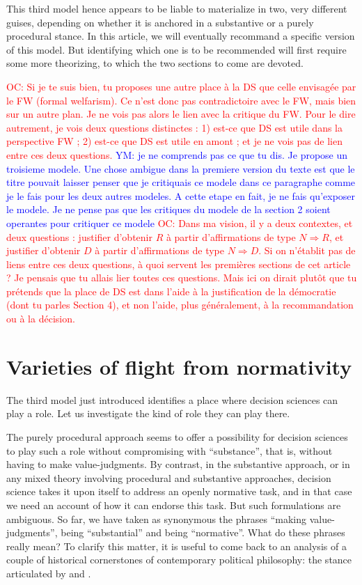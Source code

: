 \documentclass[preprint, french, english, 11pt]{elsarticle}%
\newcommand{\commentYM}[1]{\textcolor{blue}{YM: #1}}
\newcommand{\commentOC}[1]{\textcolor{red}{OC: #1}}
\begin{document}
This third model hence appears to be liable to materialize in two, very different guises, depending on whether it is anchored in a substantive or a purely procedural stance. In this article, we will eventually recommand a specific version of this model. But identifying which one is to be recommended will first require some more theorizing, to which the two sections to come are devoted. 

\commentOC{Si je te suis bien, tu proposes une
autre place à la DS que celle envisagée par le FW (formal
welfarism). Ce n’est donc pas contradictoire avec le FW, mais
bien sur un autre plan. Je ne vois pas alors le lien avec la
critique du FW.
Pour le dire autrement, je vois deux questions distinctes : 1)
est-ce que DS est utile dans la perspective FW ; 2) est-ce que
DS est utile en amont ; et je ne vois pas de lien entre ces
deux questions.}
\commentYM{je ne comprends pas ce que tu dis. Je propose un troisieme modele. Une chose ambigue dans la premiere version du texte est que le titre pouvait laisser penser que je critiquais ce modele dans ce paragraphe comme je le fais pour les deux autres modeles. A cette etape en fait, je ne fais qu'exposer le modele. Je ne pense pas que les critiques du modele de la section 2 soient operantes pour critiquer ce modele}
\commentOC{Dans ma vision, il y a deux contextes, et deux questions : justifier d’obtenir $R$ à partir d’affirmations de type $N ⇒ R$, et justifier d’obtenir $D$ à partir d’affirmations de type $N ⇒ D$. Si on n’établit pas de liens entre ces deux questions, à quoi servent les premières sections de cet article ? Je pensais que tu allais lier toutes ces questions. Mais ici on dirait plutôt que tu prétends que la place de DS est dans l’aide à la justification de la démocratie (dont tu parles Section 4), et non l’aide, plus généralement, à la recommandation ou à la décision.}

\section{Varieties of flight from normativity}
\noindent The third model just introduced identifies a place where decision sciences can play a role. Let us investigate the kind of role they can play there.

The purely procedural approach seems to offer a possibility for decision sciences to play such a role without compromising with ``substance'', that is, without having to make value-judgments. By contrast, in the substantive approach, or in any mixed theory involving procedural and substantive approaches, decision science takes it upon itself to address an openly normative task, and in that case we need an account of how it can endorse this task.
But such formulations are ambiguous. So far, we have taken as synonymous the phrases ``making value-judgments'', being ``substantial'' and being ``normative''. What do these phrases really mean? To clarify this matter, it is useful to come back to an analysis of a couple of historical cornerstones of contemporary political philosophy: the stance articulated by \cite{rawls_political_2005} and \cite{habermas_moralbewustsein_1983}.
\end{document}

